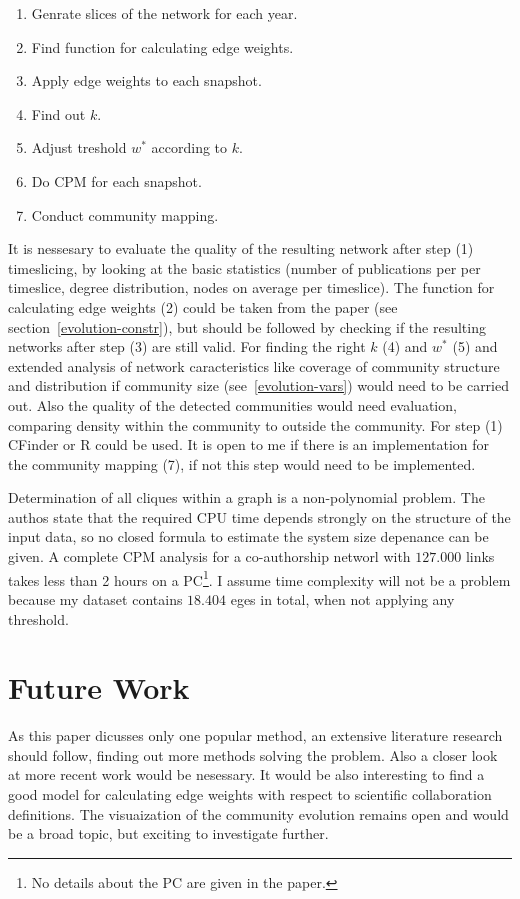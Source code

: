 \documentclass[runningheads,a4paper]{llncs}
\begin{document}
\begin{enumerate}
\small
	\item[(1)] Genrate slices of the network for each year.
	\item[(2)] Find function for calculating edge weights.
	\item[(3)] Apply edge weights to each snapshot.
	\item[(4)] Find out $k$.
	\item[(5)] Adjust treshold $w^*$ according to $k$.	
	\item[(6)] Do CPM for each snapshot.
	\item[(7)] Conduct community mapping.
\end{enumerate}

It is nessesary to evaluate the quality of the resulting network after step (1) timeslicing, by looking at the basic statistics (number of publications per per timeslice, degree distribution, nodes on average per timeslice).
The function for calculating edge weights (2) could be taken from the paper (see section~\ref{evolution-constr}), but should be followed by checking if the resulting networks after step (3) are still valid.
For finding the right $k$ (4) and $w^*$ (5) and extended analysis of network caracteristics like coverage of community structure and distribution if community size (see~\ref{evolution-vars}) would need to be carried out.
Also the quality of the detected communities would need evaluation, comparing density within the community to outside the community.
For step (1) CFinder or R could be used.
It is open to me if there is an implementation for the community mapping (7), if not this step would need to be implemented.

Determination of all cliques within a graph is a non-polynomial problem.
The authos state that the required CPU time depends strongly on the structure of the input data, so no closed formula to estimate the system size depenance can be given.
A complete CPM analysis for a co-authorship networl with $127.000$ links takes less than 2 hours on a PC\footnote{No details about the PC are given in the paper.}.
I assume time complexity will not be a problem because my dataset contains $18.404$ eges in total, when not applying any threshold.

\section{Future Work}
As this paper dicusses only one popular method, an extensive literature research should follow, finding out more methods solving the problem. Also a closer look at more recent work would be nesessary. It would be also interesting to find a good model for calculating edge weights with respect to scientific collaboration definitions. The visuaization of the community evolution remains open and would be a broad topic, but exciting to investigate further.

{
	
	
}
\end{document}

